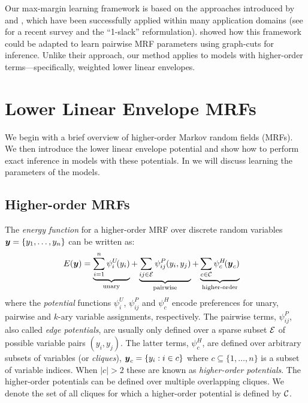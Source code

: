 \documentclass[10pt,journal,letterpaper,compsoc]{IEEEtran}
\renewcommand{\citename}{\citet}
\begin{document}
Our max-margin learning framework is based on the approaches
introduced by \citename{Tsochantaridis:ICML04, Tsochantaridis:JMLR05}
and \citename{Taskar:ICML05}, which have been successfully applied
within many application domains (see \citename{Joachims:ML09} for a
recent survey and the ``1-slack'' reformulation).
\citename{Szummer:ECCV08} showed how this framework could be adapted
to learn pairwise MRF parameters using graph-cuts for
inference. Unlike their approach, our method applies to models with
higher-order terms---specifically, weighted lower linear envelopes.



\section{Lower Linear Envelope MRFs}
\label{sec:inference}

We begin with a brief overview of higher-order Markov random fields
(MRFs). We then introduce the lower linear envelope potential and show
how to perform exact inference in models with these potentials. In
 we will discuss learning the parameters of the
models.

\subsection{Higher-order MRFs}
%
The \emph{energy function} for a higher-order MRF over discrete random
variables ${\boldsymbol{y}} = \{y_1, \ldots, y_n\}$ can be written as:
%
\begin{align}
  \energy{\by} &= \underbrace{\sum_{i=1}^{n} \psi^U_i\!(y_i)}_{\textrm{unary}} +
  \underbrace{\sum_{ij \in \E} \psi^P_{ij}(y_i, y_j)}_{\textrm{pairwise}} +
  \underbrace{\sum_{c \in \C} \psi^H_c\!(\by_c)}_{\textrm{higher-order}}
  \label{eqn:energy}
\end{align}
% 
where the \emph{potential} functions $\psi^U_i$, $\psi^P_{ij}$ and
$\psi^H_c$ encode preferences for unary, pairwise and $k$-ary variable
assignments, respectively. The pairwise terms, $\psi^P_{ij}$, also
called \emph{edge potentials}, are usually only defined over a sparse
subset $\E$ of possible variable pairs $(y_i, y_j)$. The latter terms,
$\psi^H_c$, are defined over arbitrary subsets of variables (or
\emph{cliques}), ${\boldsymbol{y}}_c = \{y_i : i \in c\}$ where $c \subseteq \{1,
\ldots, n\}$ is a subset of variable indices. When $|c| > 2$ these are
known as \emph{higher-order potentials}. The higher-order potentials
can be defined over multiple overlapping cliques. We denote the set of
all cliques for which a higher-order potential is defined by $\C$.
\end{document}

